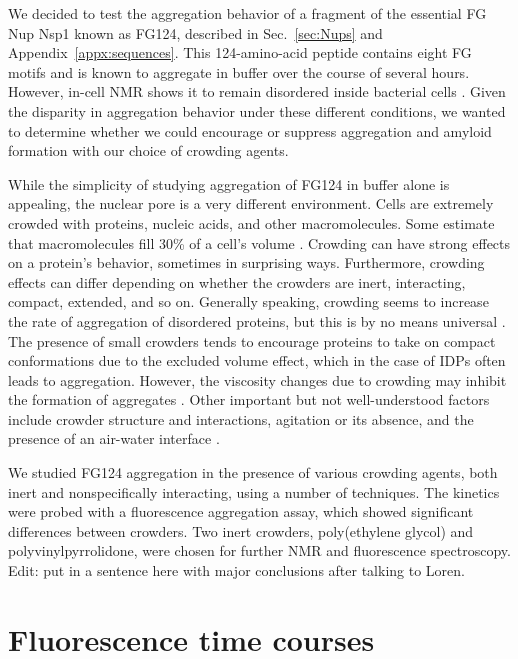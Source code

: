 We decided to test the aggregation behavior of a fragment of the essential FG Nup Nsp1 known as FG124, described in Sec.~\ref{sec:Nups} and Appendix~\ref{appx:sequences}.  This 124-amino-acid peptide contains eight FG motifs and is known to aggregate in buffer over the course of several hours.  However, in-cell NMR shows it to remain disordered inside bacterial cells \cite{hough15}.  Given the disparity in aggregation behavior under these different conditions, we wanted to determine whether we could encourage or suppress aggregation and amyloid formation with our choice of crowding agents.

While the simplicity of studying aggregation of FG124 in buffer alone is appealing, the nuclear pore is a very different environment.  Cells are extremely crowded with proteins, nucleic acids, and other macromolecules.  Some estimate that macromolecules fill 30\% of a cell's volume \cite{breydo14}.  Crowding can have strong effects on a protein's behavior, sometimes in surprising ways.  Furthermore, crowding effects can differ depending on whether the crowders are inert, interacting, compact, extended, and so on.  Generally speaking, crowding seems to increase the rate of aggregation of disordered proteins, but this is by no means universal \cite{breydo15, breydo14,lee12,magno10,milles13}.  The presence of small crowders tends to encourage proteins to take on compact conformations due to the excluded volume effect, which in the case of IDPs often leads to aggregation.  However, the viscosity changes due to crowding may inhibit the formation of aggregates \cite{sleutel12,saha16}.  Other important but not well-understood factors include crowder structure and interactions, agitation or its absence, and the presence of an air-water interface \cite{lee12, breydo14}.

We studied FG124 aggregation in the presence of various crowding agents, both inert and nonspecifically interacting, using a number of techniques.  The kinetics were probed with a fluorescence aggregation assay, which showed significant differences between crowders.  Two inert crowders, poly(ethylene glycol) and polyvinylpyrrolidone, were chosen for further NMR and fluorescence spectroscopy.  Edit: put in a sentence here with major conclusions after talking to Loren.

\section{Fluorescence time courses}

